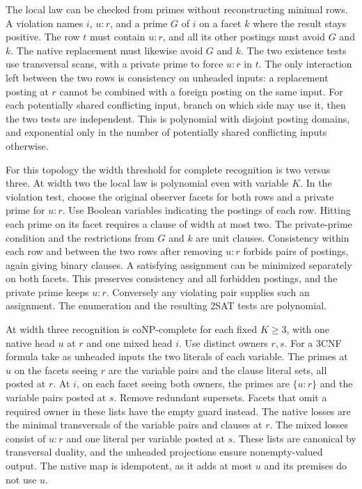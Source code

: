 The local law can be checked from primes without
reconstructing minimal rows. A violation names $i$,
$u:r$, and a prime $G$ of $i$ on a facet $k$ where the
result stays positive. The row $t$ must contain $u:r$,
and all its other postings must avoid $G$ and $k$.
The native replacement must likewise avoid $G$ and $k$.
The two existence tests use transversal scans, with a
private prime to force $u:r$ in $t$. The only interaction
left between the two rows is consistency on unheaded
inputs: a replacement posting at $r$ cannot be combined
with a foreign posting on the same input. For each
potentially shared conflicting input, branch on which
side may use it, then the two tests are independent.
This is polynomial with disjoint posting domains, and
exponential only in the number of potentially shared
conflicting inputs otherwise.

For this topology the width threshold for complete
recognition is two versus three. At width two the
local law is polynomial even with variable $K$.
In the violation test, choose the original observer
facets for both rows and a private prime for $u:r$.
Use Boolean variables indicating the postings of each
row. Hitting each prime on its facet requires a clause
of width at most two. The private-prime condition
and the restrictions from $G$ and $k$ are unit
clauses. Consistency within each row and between the
two rows after removing $u:r$ forbids pairs of
postings, again giving binary clauses. A satisfying
assignment can be minimized separately on both facets.
This preserves consistency and all forbidden postings,
and the private prime keeps $u:r$. Conversely any
violating pair supplies such an assignment. The
enumeration and the resulting 2SAT tests are polynomial.

At width three recognition is coNP-complete for
each fixed $K\ge3$, with one native head $u$ at $r$
and one mixed head $i$. Use distinct owners $r,s$.
For a 3CNF formula take as unheaded inputs the two
literals of each variable. The primes at $u$ on the
facets seeing $r$ are the variable pairs and the clause
literal sets, all posted at $r$. At $i$, on each facet
seeing both owners, the primes are $\{u:r\}$ and the
variable pairs posted at $s$. Remove redundant
supersets. Facets that omit a required owner in these
lists have the empty guard instead. The native losses
are the minimal transversals of the variable pairs and
clauses at $r$. The mixed losses consist of $u:r$ and
one literal per variable posted at $s$. These lists
are canonical by transversal duality, and the
unheaded projections ensure nonempty-valued output.
The native map is idempotent, as it adds at most $u$
and its premises do not use $u$.

